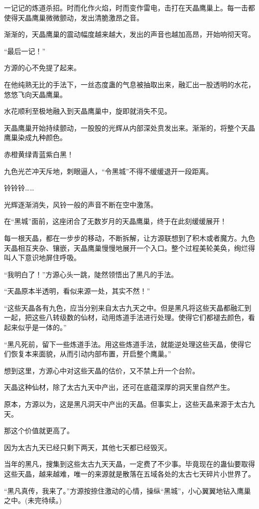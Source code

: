 \begin{this_body}
一记记的炼道杀招。时而化作火焰，时而变作雷电，击打在天晶鹰巢上。每一击都使得天晶鹰巢微微颤动，发出清脆激昂之音。

渐渐的，天晶鹰巢的震动幅度越来越大，发出的声音也越加高昂，开始响彻天穹。

“最后一记！”

方源的心不免提了起来。

在他纯熟无比的手法下，一丝态度蛊的气息被抽取出来，融汇出一股透明的水花，悠悠飞向天晶鹰巢。

水花顺利至极地融入到天晶鹰巢中，旋即就消失不见。

天晶鹰巢开始持续颤动，一股股的光辉从内部深处贲发出来。渐渐的，将整个天晶鹰巢染成九种颜色。

赤橙黄绿青蓝紫白黑！

九色光芒冲天斥地，刺眼逼人，“令黑城”不得不缓缓退开一段距离。

铃铃铃……

光辉逐渐消失，风铃一般的声音不断在空中激荡。

在“黑城”面前，这座闭合了无数岁月的天晶鹰巢，终于在此刻缓缓展开！

每一根天晶，都在一步步的移动，不断拆解，让方源联想到了积木或者魔方。九色天晶相互夹杂、镶嵌，天晶鹰巢慢慢地展开一个入口。整个过程美轮美奂，绚烂得叫人下意识地屏住呼吸。

“我明白了！”方源心头一跳，陡然领悟出了黑凡的手法。

“天晶原本半透明，看似来源一处，其实不然！”

“这些天晶各有九色，应当分别来自太古九天之中。但是黑凡将这些天晶都融汇到一起，把这些八转级数的仙材，动用炼道手法进行处理。使得它们都褪去颜色，看起来似乎是一体的。”

“黑凡死前，留下一些炼道手法。用这些炼道手法，就能逆处理这些天晶，使得它们恢复本来面貌，从而引动内部布置，开启整个鹰巢。”

想到这里，方源心中对这些天晶的估价，又不禁上升一个台阶。

天晶这种仙材，除了太古九天中产出，还可在底蕴深厚的洞天里自然产生。

原本，方源以为，这是黑凡洞天中产出的天晶。但事实上，这些天晶来源于太古九天。

那这个价值就更高了。

因为太古九天已经只剩下两天，其他七天都已经毁灭。

当年的黑凡，搜集到这些太古九天天晶，一定费了不少事。毕竟现在的蛊仙要取得这些天晶，越来越难，唯一的来源就是散落在五域各处的太古七天碎片小世界了。

“黑凡真传，我来了。”方源按捺住激动的心情，操纵“黑城”，小心翼翼地钻入鹰巢之中。(未完待续。)

\end{this_body}

